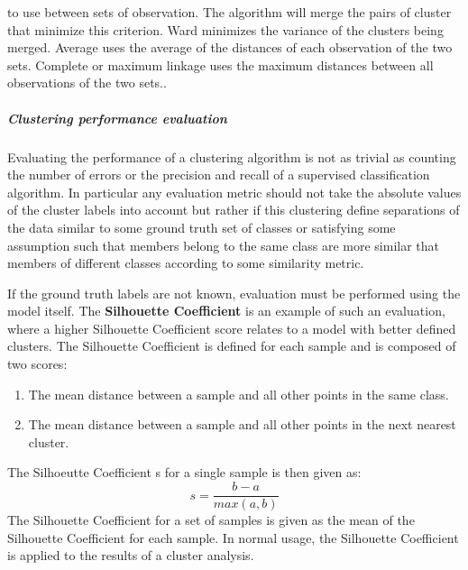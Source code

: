 \begin{itemize}
  to use between sets of observation. The algorithm will merge the pairs of cluster that minimize this criterion. Ward minimizes the variance of the clusters being merged.
  Average uses the average of the distances of each observation of the two sets. Complete or maximum linkage uses the maximum distances between all observations
  of the two sets.. 
\end{itemize}


\subparagraph{Clustering performance evaluation} \hfill
\label{subparagraph:ClusterPerformance}

Evaluating the performance of a clustering algorithm is not as trivial as
counting the number of errors or the precision and recall of a supervised
 classification algorithm. In particular any evaluation metric should not
 take the absolute values of the cluster labels into account but rather if
 this clustering define separations of the data similar to some ground truth
 set of classes or satisfying some assumption such that members belong to
the same class are more similar that members of different classes according
to some similarity metric.

If the ground truth labels are not known, evaluation must be performed using
 the model itself. The \textbf{Silhouette Coefficient} is an example of
such an evaluation, where a higher Silhouette Coefficient score relates to
 a model with better defined clusters. The Silhouette Coefficient is defined
 for each sample and is composed of two scores:
\begin{enumerate}
	\item The mean distance between a sample and all other points in the
	 same class.
	\item The mean distance between a sample and all other points in the
	 next nearest cluster.
\end{enumerate}

The Silhoeutte Coefficient s for a single sample is then given as:
\begin{equation}
s = \frac{b - a}{max(a, b)}
\end{equation}
The Silhouette Coefficient for a set of samples is given as the mean of the
 Silhouette Coefficient for each sample. In normal usage, the Silhouette
 Coefficient is applied to the results of a cluster analysis.

